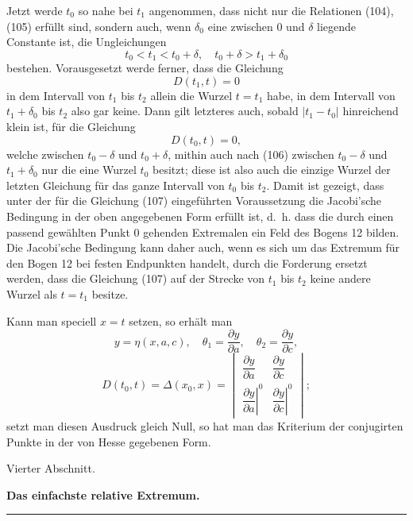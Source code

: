 \documentclass[11pt,a4paper,leqno]{article}
\begin{document}
Jetzt werde $t_0$ so nahe bei $t_1$ angenommen, dass nicht nur die Relationen (104), (105) erfüllt sind, sondern auch, wenn $\delta_0$ eine zwischen 0 und $\delta$ liegende Constante ist, die Ungleichungen
\begin{equation}\tag{106}
t_0<t_1<t_0+\delta,
\quad
t_0+\delta>t_1+\delta_0
\end{equation}
bestehen. Vorausgesetzt werde ferner, dass die Gleichung
\begin{equation}\tag{107}
D(t_1,t)=0
\end{equation}
in dem Intervall von $t_1$ bis $t_2$ allein die Wurzel $t=t_1$ habe, in dem Intervall von $t_1+\delta_0$ bis $t_2$ also gar keine. Dann gilt letzteres auch, sobald $|t_1-t_0|$ hinreichend klein ist, für die Gleichung
\[
D(t_0,t)=0,
\]
welche zwischen $t_0-\delta$ und $t_0+\delta$, mithin auch nach (106) zwischen $t_0-\delta$ und $t_1+\delta_0$ nur die eine Wurzel $t_0$ besitzt; diese ist also auch die einzige Wurzel der letzten Gleichung für das ganze Intervall von $t_0$ bis $t_2$. Damit ist gezeigt, dass unter der für die Gleichung (107) eingeführten Voraussetzung die Jacobi'sche Bedingung in der oben angegebenen Form erfüllt ist, d.~h. dass die durch einen passend gewählten Punkt 0 gehenden Extremalen ein Feld des Bogens 12 bilden. Die Jacobi'sche Bedingung kann daher auch, wenn es sich um das Extremum für den Bogen 12 bei festen Endpunkten handelt, durch die Forderung ersetzt werden, dass die Gleichung (107) auf der Strecke von $t_1$ bis $t_2$ keine andere Wurzel als $t=t_1$ besitze.

Kann man speciell $x=t$ setzen, so erhält man
\[
y=\eta(x,a,c),
\quad
\theta_1=\frac{\partial y}{\partial a},
\quad
\theta_2=\frac{\partial y}{\partial c},
\]
\[
D(t_0,t)=\Delta(x_0,x)=
\begin{vmatrix}
\dfrac{\partial y}{\partial a}&\dfrac{\partial y}{\partial c}\\[1.2ex]
\left.\dfrac{\partial y}{\partial a}\right|^0&
\left.\dfrac{\partial y}{\partial c}\right|^0
\end{vmatrix};
\]
setzt man diesen Ausdruck gleich Null, so hat man das Kriterium der conjugirten Punkte in der von Hesse gegebenen Form.



\begin{center}
{\large Vierter Abschnitt.}\par
\vspace{4mm}
{\Large\bfseries Das einfachste relative Extremum.}\par
\vspace{2mm}\rule{26mm}{0.4pt}\par
\end{center}
\end{document}
